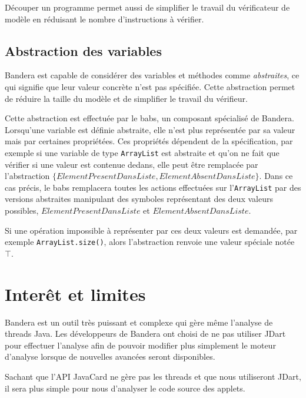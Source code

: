 Découper un programme permet aussi de simplifier le travail du
vérificateur de modèle en réduisant le nombre d'instructions à
vérifier.

\subsection{Abstraction des variables}

Bandera est capable de considérer des variables et méthodes comme
\textit{abstraites}, ce qui signifie que leur valeur concrète n'est
pas spécifiée. Cette abstraction permet de réduire la taille du modèle
et de simplifier le travail du vérifieur.

Cette abstraction est effectuée par le \gls{babs}, un composant
spécialisé de Bandera. Lorsqu'une variable est définie abstraite, elle
n'est plus représentée par sa valeur mais par certaines
propriétées. Ces propriétés dépendent de la spécification, par exemple
si une variable de type \verb|ArrayList| est abstraite et qu'on ne
fait que vérifier si une valeur est contenue dedans, elle peut être
remplacée par l'abstraction
$\{ ElementPresentDansListe, ElementAbsentDansListe \}$. Dans ce cas
précis, le \gls{babs} remplacera toutes les actions effectuées sur
l'\verb|ArrayList| par des versions abstraites manipulant des symboles
représentant des deux valeurs possibles, $ElementPresentDansListe$ et
$ElementAbsentDansListe$.

Si une opération impossible à représenter par ces deux valeurs est
demandée, par exemple \verb|ArrayList.size()|, alors l'abstraction
renvoie une valeur spéciale notée $\top$.

\section{Interêt et limites}

Bandera est un outil très puissant et complexe qui gère même l'analyse
de threads Java. Les développeurs de Bandera ont choisi de ne pas
utiliser JDart pour effectuer l'analyse afin de pouvoir modifier plus
simplement le moteur d'analyse lorsque de nouvelles avancées seront
disponibles.

Sachant que l'API JavaCard ne gère pas les threads et que nous
utiliseront JDart, il sera plus simple pour nous d'analyser le code
source des applets.


